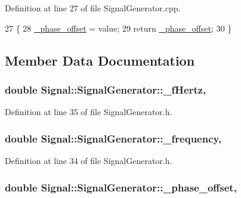 Definition at line 27 of file Signal\+Generator.\+cpp.


\begin{DoxyCode}
27                                                                    \{
28     \hyperlink{classSignal_1_1SignalGenerator_a6b4444d46747c8517171edbbf4b5588f}{\_phase\_offset} = value;
29     \textcolor{keywordflow}{return} \hyperlink{classSignal_1_1SignalGenerator_a6b4444d46747c8517171edbbf4b5588f}{\_phase\_offset};
30 \}
\end{DoxyCode}


\subsection{Member Data Documentation}
\hypertarget{classSignal_1_1SignalGenerator_a85a4702347352bab1c71e0a8df8437d6}{
\subsubsection[{\+\_\+f\+Hertz}]{\setlength{\rightskip}{0pt plus 5cm}double Signal\+::\+Signal\+Generator\+::\+\_\+f\+Hertz\hspace{0.3cm}{\ttfamily [protected]}, {\ttfamily [inherited]}}}\label{classSignal_1_1SignalGenerator_a85a4702347352bab1c71e0a8df8437d6}


Definition at line 35 of file Signal\+Generator.\+h.

\hypertarget{classSignal_1_1SignalGenerator_a7f107461333bce68c5dad412db96a8c2}{
\subsubsection[{\+\_\+frequency}]{\setlength{\rightskip}{0pt plus 5cm}double Signal\+::\+Signal\+Generator\+::\+\_\+frequency\hspace{0.3cm}{\ttfamily [protected]}, {\ttfamily [inherited]}}}\label{classSignal_1_1SignalGenerator_a7f107461333bce68c5dad412db96a8c2}


Definition at line 34 of file Signal\+Generator.\+h.

\hypertarget{classSignal_1_1SignalGenerator_a6b4444d46747c8517171edbbf4b5588f}{
\subsubsection[{\+\_\+phase\+\_\+offset}]{\setlength{\rightskip}{0pt plus 5cm}double Signal\+::\+Signal\+Generator\+::\+\_\+phase\+\_\+offset\hspace{0.3cm}{\ttfamily [protected]}, {\ttfamily [inherited]}}}\label{classSignal_1_1SignalGenerator_a6b4444d46747c8517171edbbf4b5588f}


